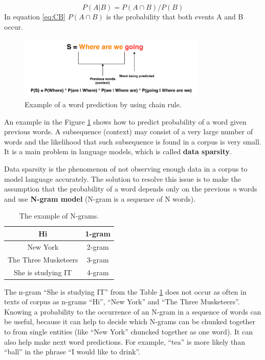 \begin{equation} \label{eq:CB}
P(A|B) = P(A \cap B) / P(B)
\end{equation}
In equation \ref{eq:CB} $P(A \cap B)$ is the probability that both events A and B occur.

\begin{figure}[hbt]
  \centering
  \includegraphics[width=0.8\textwidth]{figures/lm.pdf}
  \caption{Example of a word prediction by using chain rule.}
  \label{chain_rule}
\end{figure}

An example in the Figure \ref{chain_rule} shows how to predict probability of a word given previous words. A subsequence (context) may consist of a very large number of words and the likelihood that such subsequence is found in a corpus is very small. It is a main problem in language models, which is called \textbf{data sparsity}.

Data sparsity is the phenomenon of not observing enough data in a corpus to model language accurately. The solution to resolve this issue is to make the assumption that the probability of a word depends only on the previous \textit{n} words and use \textbf{N-gram model} (N-gram is a sequence of N words).

\begin{table}[ht]
  \centering
   \begin{tabular}{|c|c|} 
   \hline
    Hi & 1-gram \\
   \hline
    New York & 2-gram \\
   \hline
   The Three Musketeers & 3-gram \\
   \hline
   She is studying IT & 4-gram \\
   \hline
   \end{tabular}
   \caption{The example of N-grams.}
  \label{tab:n_gram}
\end{table}

The n-gram ``She is studying IT'' from the Table \ref{tab:n_gram} does not occur as often in texts of corpus as n-grams ``Hi'', ``New York'' and ``The Three Musketeers''. Knowing a probability to the occurrence of an N-gram in a sequence of words can be useful, because it can help to decide which N-grams can be chunked together to from single entities (like ``New York'' chuncked together as one word). It can also help make next word predictions. For example, ``tea'' is more likely than ``ball'' in the phrase ``I would like to drink''.


